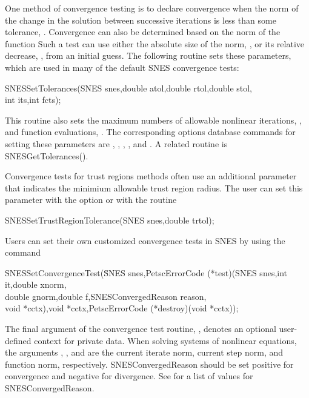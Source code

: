 One method of convergence testing is
to declare convergence when the norm of the change in the solution
between successive iterations is less than some tolerance, .
Convergence can also be determined based on the norm of the function
Such a test can use either the absolute size of the
norm, , or its relative decrease, , from an initial
guess.  The following routine sets these parameters, which are used
in many of the default SNES convergence tests: 
\begin{tabbing}
  SNESSetTolerances(SNES snes,double atol,double rtol,double stol,\\
          int its,int fcts);
\end{tabbing}
This routine also sets the maximum numbers of allowable
nonlinear iterations, , and function evaluations, .
The corresponding options database commands for setting these parameters
are , , ,
   
 
, and .
A related routine is SNESGetTolerances().

Convergence tests for trust regions methods often use an additional
parameter that indicates the minimium allowable trust region radius.
The user can set this parameter with the option 
 or with the routine
\begin{tabbing}
  SNESSetTrustRegionTolerance(SNES snes,double trtol);
\end{tabbing}

Users can set their own customized convergence tests in SNES by using
the command
\begin{tabbing}
  SNESSetConvergenceTest(\=SNES snes,PetscErrorCode (*test)(SNES snes,int it,double xnorm,\\
                         \>double gnorm,double f,SNESConvergedReason reason,\\
                         \>void *cctx),void *cctx,PetscErrorCode (*destroy)(void *cctx));
\end{tabbing}
The final argument of the convergence test routine, ,
denotes an optional user-defined context for private data.  When
solving systems of nonlinear equations, the arguments ,
, and  are the current iterate norm, current step
norm, and function norm, respectively. 
SNESConvergedReason should be set positive
for convergence and negative for divergence. See 
for a list of values for SNESConvergedReason.

